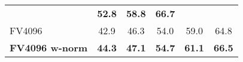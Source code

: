\begin{tabularx}{0.883\linewidth}{|l|c c c c c|}
														&\textcolor{petr}{\textbf{52.8}}       
														&\textcolor{petr}{\textbf{58.8}}       
														&\textcolor{petr}{\textbf{66.7}} \\
	    \rowcolor{maroon!10}
	    \hline   
	    \textcolor{petr}{FV4096}						&\textcolor{petr}{42.9}     
	    												&\textcolor{petr}{46.3}     
	    												&\textcolor{petr}{54.0}     
	    												&\textcolor{petr}{59.0}    
	    												&\textcolor{petr}{64.8}   \\ 
	    \rowcolor{maroon!10}
	    \textcolor{petr}{\textbf{FV4096 w-norm}}		&\textcolor{petr}{\textbf{44.3}}      
	    												&\textcolor{petr}{\textbf{47.1}}      
	    												&\textcolor{petr}{\textbf{54.7}}      
	    												&\textcolor{petr}{\textbf{61.1}}      
	    												&\textcolor{petr}{\textbf{66.5}} 	\\
	    \hline
\end{tabularx}

